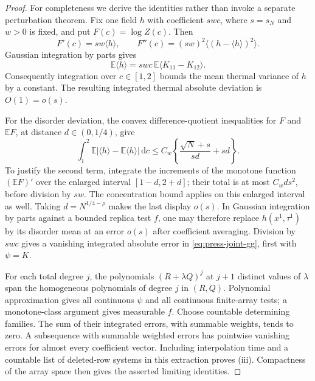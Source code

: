 \documentclass[11pt,a4paper]{article}
\numberwithin{equation}{section}
\theoremstyle{definition}
\theoremstyle{remark}
\newcommand{\E}{\mathbb E}
\newcommand{\dd}{\mathrm d}
\begin{document}
\begin{proof}
For completeness we derive the identities rather than invoke a separate
perturbation theorem. Fix one field $h$ with coefficient $swc$, where
$s=s_N$ and $w>0$ is fixed, and put $F(c)=\log Z(c)$. Then
\[
 F'(c)=sw\langle h\rangle,\qquad
 F''(c)=(sw)^2\langle(h-\langle h\rangle)^2\rangle.
\]
Gaussian integration by parts gives
\[
 \E\langle h\rangle=swc\,\E\langle K_{11}-K_{12}\rangle.
\]
Consequently integration over $c\in[1,2]$ bounds the mean thermal variance of
$h$ by a constant. The resulting integrated thermal absolute deviation is
$O(1)=o(s)$.

For the disorder deviation, the convex difference-quotient inequalities for
$F$ and $\E F$, at distance $d\in(0,1/4)$, give
\[
 \int_1^2\E|\langle h\rangle-\E\langle h\rangle|\,\dd c
 \le C_w\left\{\frac{\sqrt N+s}{sd}+sd\right\}.
\]
To justify the second term, integrate the increments of the monotone
function $(\E F)'$ over the enlarged interval $[1-d,2+d]$; their total is at
most $C_w d s^2$, before division by $sw$. The concentration bound applies
on this enlarged interval as well. Taking $d=N^{1/4-\rho}$ makes the last
display $o(s)$. In Gaussian integration by parts against a bounded replica
test $f$, one may therefore replace $h(x^1,\tau^1)$ by its disorder mean at
an error $o(s)$ after coefficient averaging. Division by $swc$ gives a
vanishing integrated absolute error in \eqref{eq:press-joint-gg}, first with
$\psi=K$.

For each total degree $j$, the polynomials $(R+\lambda Q)^j$ at $j+1$
distinct values of $\lambda$ span the homogeneous polynomials of degree $j$
in $(R,Q)$. Polynomial approximation gives all continuous $\psi$ and all
continuous finite-array tests; a monotone-class argument gives measurable
$f$. Choose countable determining families. The sum of their integrated
errors, with summable weights, tends to zero. A subsequence with summable
weighted errors has pointwise vanishing errors for almost every coefficient
vector. Including interpolation time and a countable list of deleted-row
systems in this extraction proves (iii). Compactness of the array space
then gives the asserted limiting identities.
\end{proof}
\end{document}
